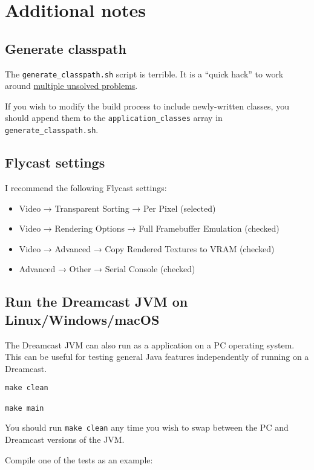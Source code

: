 \documentclass[20pt]{article}
\begin{document}
\section{Additional notes}

\subsection{Generate classpath}

The \texttt{generate\_classpath.sh} script is terrible. It is a ``quick hack''
to work around \hyperref[sec:unsolved]{multiple unsolved problems}.

If you wish to modify the build process to include newly-written classes, you
should append them to the \texttt{application\_classes} array in
\texttt{generate\_classpath.sh}.

\subsection{Flycast settings}

I recommend the following Flycast settings:

\begin{itemize}
\item Video → Transparent Sorting → Per Pixel (selected)
\item Video → Rendering Options → Full Framebuffer Emulation (checked)
\item Video → Advanced → Copy Rendered Textures to VRAM (checked)
\item Advanced → Other → Serial Console (checked)
\end{itemize}

\subsection{Run the Dreamcast JVM on Linux/Windows/macOS}

The Dreamcast JVM can also run as a application on a PC operating system. This
can be useful for testing general Java features independently of running on a
Dreamcast.

\begin{verbatim}
make clean

make main
\end{verbatim}

You should run \texttt{make clean} any time you wish to swap between the PC and
Dreamcast versions of the JVM.

Compile one of the tests as an example:
\end{document}

